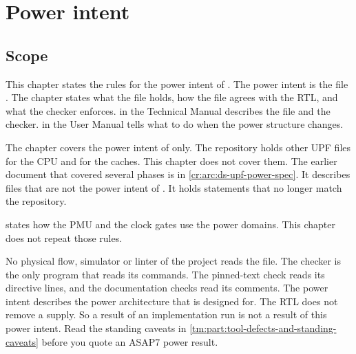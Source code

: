 \chapter{Power intent}\label{ds:ch:power-intent}\label{ds:ch:upf-power-spec}

\section{Scope}\label{ds:ch:power-intent:scope}
This chapter states the rules for the power intent of . The power intent is the file . The chapter states what the file holds, how the file agrees with the RTL, and what the checker  enforces.  in the Technical Manual describes the file and the checker.  in the User Manual tells what to do when the power structure changes.

The chapter covers the power intent of  only. The repository holds other UPF files for the CPU and for the caches. This chapter does not cover them. The earlier document that covered several phases is in \cref{cr:arc:ds-upf-power-spec}. It describes files that are not the power intent of . It holds statements that no longer match the repository.

 states how the PMU and the clock gates use the power domains. This chapter does not repeat those rules.

\begin{information}
No physical flow, simulator or linter of the project reads the file. The checker is the only program that reads its commands. The pinned-text check reads its directive lines, and the documentation checks read its comments. The power intent describes the power architecture that  is designed for. The RTL does not remove a supply. So a result of an implementation run is not a result of this power intent. Read the standing caveats in \cref{tm:part:tool-defects-and-standing-caveats} before you quote an ASAP7 power result.
\end{information}

